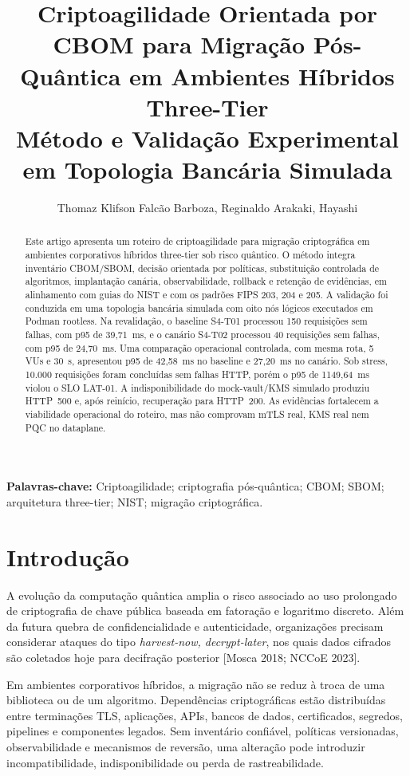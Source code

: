 \documentclass[12pt]{article}
\title{Criptoagilidade Orientada por CBOM para Migra\c{c}\~ao P\'os-Qu\^antica em Ambientes H\'ibridos Three-Tier\\
M\'etodo e Valida\c{c}\~ao Experimental em Topologia Banc\'aria Simulada}
\author{Thomaz Klifson Falc\~ao Barboza\inst{1}, Reginaldo Arakaki\inst{1}, Hayashi\inst{1}}
\newcommand{\sbcshortcite}[2]{[#1]\nocite{#2}}
\begin{document}
\maketitle

\begin{abstract}
Este artigo apresenta um roteiro de criptoagilidade para migra\c{c}\~ao criptogr\'afica em ambientes corporativos h\'ibridos three-tier sob risco qu\^antico. O m\'etodo integra invent\'ario CBOM/SBOM, decis\~ao orientada por pol\'iticas, substitui\c{c}\~ao controlada de algoritmos, implanta\c{c}\~ao can\'aria, observabilidade, rollback e reten\c{c}\~ao de evid\^encias, em alinhamento com guias do NIST e com os padr\~oes FIPS 203, 204 e 205. A valida\c{c}\~ao foi conduzida em uma topologia banc\'aria simulada com oito n\'os l\'ogicos executados em Podman rootless. Na revalida\c{c}\~ao, o baseline S4-T01 processou 150 requisi\c{c}\~oes sem falhas, com p95 de 39{,}71~ms, e o can\'ario S4-T02 processou 40 requisi\c{c}\~oes sem falhas, com p95 de 24{,}70~ms. Uma compara\c{c}\~ao operacional controlada, com mesma rota, 5 VUs e 30~s, apresentou p95 de 42{,}58~ms no baseline e 27{,}20~ms no can\'ario. Sob stress, 10.000 requisi\c{c}\~oes foram conclu\'idas sem falhas HTTP, por\'em o p95 de 1149{,}64~ms violou o SLO LAT-01. A indisponibilidade do mock-vault/KMS simulado produziu HTTP~500 e, ap\'os rein\'icio, recupera\c{c}\~ao para HTTP~200. As evid\^encias fortalecem a viabilidade operacional do roteiro, mas n\~ao comprovam mTLS real, KMS real nem PQC no dataplane.
\end{abstract}

\noindent\textbf{Palavras-chave:} Criptoagilidade; criptografia p\'os-qu\^antica; CBOM; SBOM; arquitetura three-tier; NIST; migra\c{c}\~ao criptogr\'afica.

\section{Introdu\c{c}\~ao}
A evolu\c{c}\~ao da computa\c{c}\~ao qu\^antica amplia o risco associado ao uso prolongado de criptografia de chave p\'ublica baseada em fatora\c{c}\~ao e logaritmo discreto. Al\'em da futura quebra de confidencialidade e autenticidade, organiza\c{c}\~oes precisam considerar ataques do tipo \textit{harvest-now, decrypt-later}, nos quais dados cifrados s\~ao coletados hoje para decifra\c{c}\~ao posterior \sbcshortcite{Mosca 2018; NCCoE 2023}{mosca2018,nist1800b}.

Em ambientes corporativos h\'ibridos, a migra\c{c}\~ao n\~ao se reduz \`a troca de uma biblioteca ou de um algoritmo. Depend\^encias criptogr\'aficas est\~ao distribu\'idas entre termina\c{c}\~oes TLS, aplica\c{c}\~oes, APIs, bancos de dados, certificados, segredos, pipelines e componentes legados. Sem invent\'ario confi\'avel, pol\'iticas versionadas, observabilidade e mecanismos de revers\~ao, uma altera\c{c}\~ao pode introduzir incompatibilidade, indisponibilidade ou perda de rastreabilidade.
\end{document}
